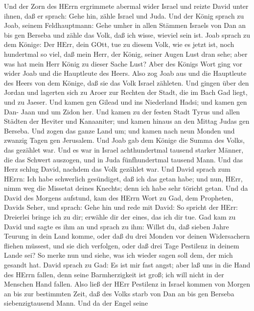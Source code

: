  Und der Zorn des HErrn ergrimmete abermal wider Israel und
reizte David unter ihnen, daß er sprach: Gehe hin, zähle Israel und
Juda.  Und der König sprach zu Joab, seinem Feldhauptmann:
Gehe umher in allen Stämmen Israels von Dan an bis gen Berseba und zähle
das Volk, daß ich wisse, wieviel sein ist.  Joab sprach zu
dem Könige: Der HErr, dein GOtt, tue zu diesem Volk, wie es jetzt ist,
noch hundertmal so viel, daß mein Herr, der König, seiner Augen Lust
dran sehe; aber was hat mein Herr König zu dieser Sache Lust?
 Aber des Königs Wort ging vor wider Joab und die Hauptleute
des Heers. Also zog Joab aus und die Hauptleute des Heers von dem
Könige, daß sie das Volk Israel zähleten.  Und gingen über
den Jordan und lagerten sich zu Aroer zur Rechten der Stadt, die im Bach
Gad liegt, und zu Jaeser.  Und kamen gen Gilead und ins
Niederland Hadsi; und kamen gen Dan- Jaan und um Zidon her. 
Und kamen zu der festen Stadt Tyrus und allen Städten der Heviter und
Kanaaniter; und kamen hinaus an den Mittag Judas gen Berseba.
 Und zogen das ganze Land um; und kamen nach neun Monden und
zwanzig Tagen gen Jerusalem.  Und Joab gab dem Könige die
Summa des Volks, das gezählet war. Und es war in Israel achthundertmal
tausend starker Männer, die das Schwert auszogen, und in Juda
fünfhundertmal tausend Mann.  Und das Herz schlug David,
nachdem das Volk gezählet war. Und David sprach zum HErrn: Ich habe
schwerlich gesündiget, daß ich das getan habe; und nun, HErr, nimm weg
die Missetat deines Knechts; denn ich habe sehr töricht getan.
 Und da David des Morgens aufstund, kam des HErrn Wort zu
Gad, dem Propheten, Davids Seher, und sprach:  Gehe hin und
rede mit David: So spricht der HErr: Dreierlei bringe ich zu dir;
erwähle dir der eines, das ich dir tue.  Gad kam zu David
und sagte es ihm an und sprach zu ihm: Willst du, daß sieben Jahre
Teurung in dein Land komme, oder daß du drei Monden vor deinen
Widersachern fliehen müssest, und sie dich verfolgen, oder daß drei Tage
Pestilenz in deinem Lande sei? So merke nun und siehe, was ich wieder
sagen soll dem, der mich gesandt hat.  David sprach zu Gad:
Es ist mir fast angst; aber laß uns in die Hand des HErrn fallen, denn
seine Barmherzigkeit ist groß; ich will nicht in der Menschen Hand
fallen.  Also ließ der HErr Pestilenz in Israel kommen von
Morgen an bis zur bestimmten Zeit, daß des Volks starb von Dan an bis
gen Berseba siebenzigtausend Mann.  Und da der Engel seine
